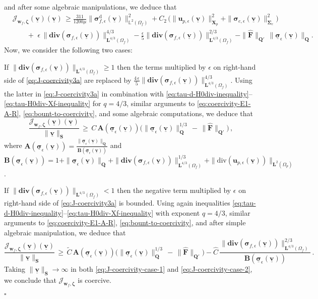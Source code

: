 \documentclass[11pt]{article}
\numberwithin{equation}{section}
\newcommand{\bsi}{{\boldsymbol\sigma}}
\newcommand{\bSigma}{{\boldsymbol\Sigma}}
\newcommand{\bzeta}{{\boldsymbol\zeta}}
\newcommand{\ubsi}{\underline{\bsi}}
\newcommand{\ubv}{\underline{\bv}}
\newcommand{\bv}{{\mathbf{v}}}
\newcommand{\bw}{{\mathbf{w}}}
\newcommand{\bu}{\mathbf{u}}
\newcommand{\0}{{\mathbf{0}}}
\def\bA{\mathbf{A}}
\def\bB{\mathbf{B}}
\def\bF{\mathbf{F}}
\def\bX{\mathbf{X}}
\def\bQ{\mathbf{Q}}
\def\bS{\mathbf{S}}
\newcommand{\bL}{\mathbf{L}}
\newcommand\bbL{\mathbb{L}}
\newcommand{\cJ}{\mathcal{J}}
\def\rd{\mathrm{d}}
\def\bdiv{\mathbf{div}}
\def\div{\mathrm{div}}
\def\wt{\widetilde}
\def\wh{\widehat}
\newenvironment{proof}{\noindent{\it Proof.}}{\hfill$\square$}
\numberwithin{equation}{section}
\begin{document}
\begin{proof}
\begin{equation}
\end{equation} 
and after some algebraic manipulations, we deduce that
\begin{align}
&\cJ_{\bw_f,\bzeta}(\ubv)(\ubv) 
\,\geq \frac{311}{1200\mu}\|\bsi^\rd_{f,\epsilon}(\ubv)\|^2_{\bbL^2(\Omega_f)} + C_2\,\Big( \|\bu_{p,\epsilon}(\ubv)\|^2_{\bX_p} + \|\bsi_{e,\epsilon}(\ubv)\|^2_{\bSigma_e} \Big) \nonumber\\
&\qquad +\,\, \epsilon\,\|\bdiv(\bsi_{f,\epsilon}(\ubv))\|^{4/3}_{\bL^{4/3}(\Omega_f)} - \frac{\epsilon}{5}\|\bdiv(\bsi_{f,\epsilon}(\ubv))\|^{2/3}_{\bL^{4/3}(\Omega_f)} - \|\wh{\bF}\|_{\bQ'}\,\|\ubsi_\epsilon(\ubv)\|_{\bQ}.\label{eq:J-coercivity3a}
\end{align}
Now, we consider the following two cases:

\medskip
{} If $\|\bdiv(\bsi_{f,\epsilon}(\ubv))\|_{\bL^{4/3}(\Omega_f)} \geq 1$
then the terms multiplied by $\epsilon$ on right-hand side of \eqref{eq:J-coercivity3a} are replaced by  $\frac{4\,\epsilon}{5}\|\bdiv(\bsi_{f,\epsilon}(\ubv))\|^{4/3}_{\bL^{4/3}(\Omega_f)}$.
Using the latter in \eqref{eq:J-coercivity3a} in combination with \eqref{eq:tau-d-H0div-inequality}--\eqref{eq:tau-H0div-Xf-inequality} for $q=4/3$, similar arguments to \eqref{eq:coercivity-E1-A-R}, \eqref{eq:bount-to-coercivity}, and some algebraic computations, we deduce that
\begin{equation}\label{eq:J-coercivity-case-1}
\frac{\cJ_{\bw_f,\bzeta}(\ubv)(\ubv)}{\|\ubv\|_\bS} 
\,\geq\, C\,\bA(\ubsi_\epsilon(\ubv))\Big(\|\ubsi_\epsilon(\ubv)\|^{1/3}_\bQ \,-\, \|\wh{\bF}\|_{\bQ'} \Big)\,,
\end{equation}
where $\bA(\ubsi_\epsilon(\ubv)) = \frac{\|\ubsi_\epsilon(\ubv)\|_\bQ}{\bB(\ubsi_\epsilon(\ubv))}$ and $\bB(\ubsi_\epsilon(\ubv))= 1 + \|\ubsi_\epsilon(\ubv)\|_\bQ + \|\bdiv(\bsi_{f,\epsilon}(\ubv))\|^{1/3}_{\bL^{4/3}(\Omega_f)}+ \|\div(\bu_{p,\epsilon}(\ubv))\|_{\bL^2(\Omega_p)}$. 

\medskip
{} If $\|\bdiv(\bsi_{f,\epsilon}(\ubv))\|_{\bL^{4/3}(\Omega_f)} < 1$ then the negative term multiplied by $\epsilon$ on right-hand side of \eqref{eq:J-coercivity3a} is bounded. 
Using again inequalities \eqref{eq:tau-d-H0div-inequality}--\eqref{eq:tau-H0div-Xf-inequality} with exponent $q=4/3$, similar arguments to \eqref{eq:coercivity-E1-A-R},
\eqref{eq:bount-to-coercivity}, and after simple algebraic manipulation, we deduce that
\begin{equation}\label{eq:J-coercivity-case-2}
\frac{\cJ_{\bw_f,\bzeta}(\ubv)(\ubv)}{\|\ubv\|_\bS} 
\,\geq\, \wt{C}\,\bA(\ubsi_\epsilon(\ubv)) \Big(\|\ubsi_\epsilon(\ubv)\|^{1/3}_\bQ \,-\, \|\wh{\bF}\|_{\bQ'} \Big) 
- \wh{C}\,\frac{\|\bdiv(\bsi_{f,\epsilon}(\ubv))\|^{2/3}_{\bL^{4/3}(\Omega_f)}}{\bB(\ubsi_\epsilon(\ubv))}\,.
\end{equation}
Taking $\|\ubv\|_\bS\to \infty$ in both \eqref{eq:J-coercivity-case-1} and \eqref{eq:J-coercivity-case-2}, we conclude that $\cJ_{\bw_f,\bzeta}$ is coercive.



\end{proof}
\end{document}
